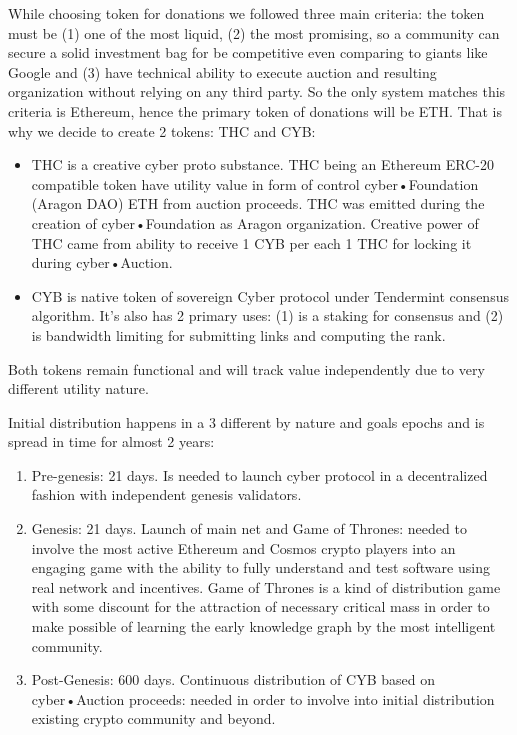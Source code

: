 \documentclass[10pt,oneside]{amsart}
\begin{document}
While choosing token for donations we followed three main criteria: the token must be (1) one of the most liquid, (2) the most promising, so a community can secure a solid investment bag for be competitive even comparing to giants like Google and (3) have technical ability to execute auction and resulting organization without relying on any third party. So the only system matches this criteria is Ethereum, hence the primary token of donations will be ETH. That is why we decide to create 2 tokens: THC and CYB:

\begin{itemize}
\item THC is a creative cyber proto substance. THC being an Ethereum ERC-20 compatible token have utility value in form of control cyber•Foundation (Aragon DAO) ETH from auction proceeds. THC was emitted during the creation of cyber•Foundation as Aragon organization. Creative power of THC came from ability to receive 1 CYB per each 1 THC for locking it during cyber•Auction.
\item CYB is native token of sovereign Cyber protocol under Tendermint consensus algorithm. It's also has 2 primary uses: (1) is a staking for consensus and (2) is bandwidth limiting for submitting links and computing the rank.
\end{itemize}

Both tokens remain functional and will track value independently due to very different utility nature.

Initial distribution happens in a 3 different by nature and goals epochs and is spread in time for almost 2 years:

\begin{enumerate}
 \item Pre-genesis: 21 days. Is needed to launch cyber protocol in a decentralized fashion with independent genesis validators.
 \item Genesis: 21 days. Launch of main net and Game of Thrones: needed to involve the most active Ethereum and Cosmos crypto players into an engaging game with the ability to fully understand and test software using real network and incentives. Game of Thrones is a kind of distribution game with some discount for the attraction of necessary critical mass in order to make possible of learning the early knowledge graph by the most intelligent community.
 \item Post-Genesis: 600 days. Continuous distribution of CYB based on cyber•Auction proceeds: needed in order to involve into initial distribution existing crypto community and beyond.
\end{enumerate}
\end{document}
